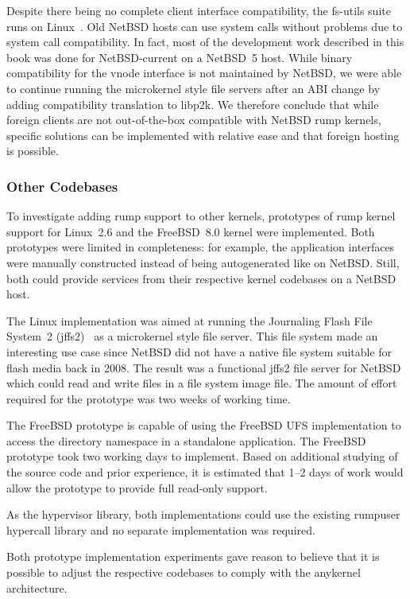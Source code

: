 Despite there being no complete client interface compatibility,
the fs-utils suite runs on Linux~\cite{ysmal:fs-utils}.  Old NetBSD
hosts can use system calls without problems due to system call
compatibility.  In fact, most of the development work described in
this book was done for NetBSD-current on a NetBSD~5 host.
While binary compatibility for the vnode interface is not maintained
by NetBSD,
we were able to continue running the microkernel style file servers
after an ABI change by adding compatibility translation to libp2k.
We therefore conclude that while foreign clients are not out-of-the-box
compatible with NetBSD rump kernels, specific solutions can be
implemented with relative ease and that foreign hosting is possible.

\subsubsection{Other Codebases}
\label{sect:otherkern}

To investigate adding rump support to other kernels, prototypes
of rump kernel support for Linux~2.6 and the FreeBSD~8.0 kernel
were implemented.  Both prototypes were limited in
completeness: for example, the application interfaces were manually constructed
instead
of being autogenerated like on NetBSD.  Still, both could provide
services from their respective kernel codebases on a NetBSD host.

The Linux implementation was aimed at running the Journaling Flash
File System~2 (jffs2)~\cite{woodhouse:jffs2} as a microkernel
style file server.  This file system made an interesting use case since
NetBSD did not have a native file system suitable for flash media back
in 2008.  The result was a functional jffs2 file server for NetBSD which
could read and write files in a file system image file.  The amount of
effort required for the prototype was two weeks of working time.

The FreeBSD prototype is capable of using the FreeBSD UFS
implementation to access the directory namespace in a standalone
application.  The FreeBSD prototype took two working days to
implement.  Based on additional studying of the source code and prior
experience, it is estimated that 1--2 days of work would allow the
prototype to provide full read-only support.

As the hypervisor library, both implementations could use the
existing rumpuser hypercall library and no separate implementation
was required.

Both prototype implementation experiments gave reason to believe
that it is possible to adjust the respective codebases to comply
with the anykernel architecture.

